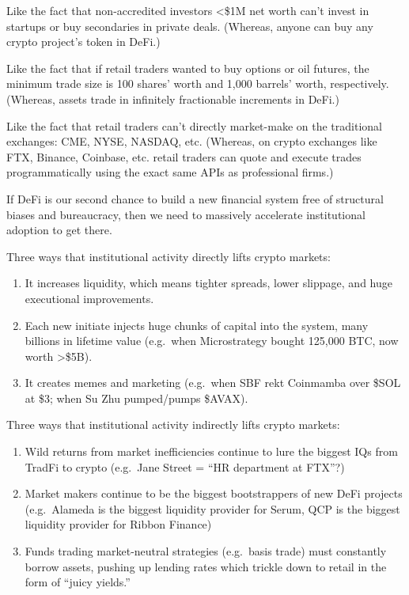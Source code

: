 \documentclass[
]{book}
\begin{document}
Like the fact that non-accredited investors \textless\$1M net worth can't invest in startups or buy secondaries in private deals. (Whereas, anyone can buy any crypto project's token in DeFi.)

Like the fact that if retail traders wanted to buy options or oil futures, the minimum trade size is 100 shares' worth and 1,000 barrels' worth, respectively. (Whereas, assets trade in infinitely fractionable increments in DeFi.)

Like the fact that retail traders can't directly market-make on the traditional exchanges: CME, NYSE, NASDAQ, etc. (Whereas, on crypto exchanges like FTX, Binance, Coinbase, etc. retail traders can quote and execute trades programmatically using the exact same APIs as professional firms.)

If DeFi is our second chance to build a new financial system free of structural biases and bureaucracy, then we need to massively accelerate institutional adoption to get there.

Three ways that institutional activity directly lifts crypto markets:

\begin{enumerate}
\def\labelenumi{\arabic{enumi}.}
\item
  It increases liquidity, which means tighter spreads, lower slippage, and huge executional improvements.
\item
  Each new initiate injects huge chunks of capital into the system, many billions in lifetime value (e.g.~when Microstrategy bought 125,000 BTC, now worth \textgreater\$5B).
\item
  It creates memes and marketing (e.g.~when SBF rekt Coinmamba over \$SOL at \$3; when Su Zhu pumped/pumps \$AVAX).
\end{enumerate}

Three ways that institutional activity indirectly lifts crypto markets:

\begin{enumerate}
\def\labelenumi{\arabic{enumi}.}
\item
  Wild returns from market inefficiencies continue to lure the biggest IQs from TradFi to crypto (e.g.~Jane Street = ``HR department at FTX''?)
\item
  Market makers continue to be the biggest bootstrappers of new DeFi projects (e.g.~Alameda is the biggest liquidity provider for Serum, QCP is the biggest liquidity provider for Ribbon Finance)
\item
  Funds trading market-neutral strategies (e.g.~basis trade) must constantly borrow assets, pushing up lending rates which trickle down to retail in the form of ``juicy yields.''
\end{enumerate}
\end{document}
